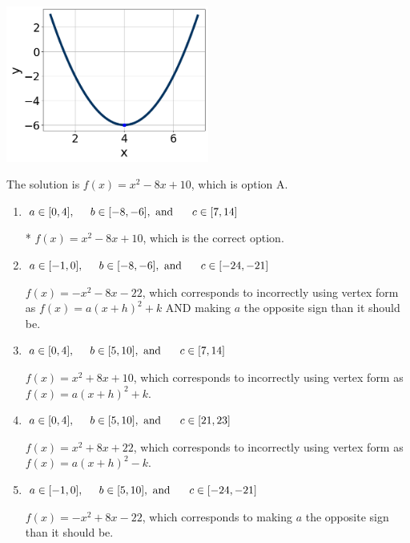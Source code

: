 \documentclass{extbook}[14pt]
\begin{document}
\begin{enumerate}
{\begin{center}
    \includegraphics[width=0.5\textwidth]{../Figures/quadraticGraphToEquationC.png}
\end{center}


The solution is \( f(x) = x^{2} -8 x + 10 \), which is option A.\begin{enumerate}[label=\Alph*.]
\item \( a \in [0, 4], \hspace*{5mm} b \in [-8, -6], \text{ and } \hspace*{5mm} c \in [7, 14] \)

* $f(x)=x^{2} -8 x + 10$, which is the correct option.
\item \( a \in [-1, 0], \hspace*{5mm} b \in [-8, -6], \text{ and } \hspace*{5mm} c \in [-24, -21] \)

$f(x)=-x^{2} -8 x -22$, which corresponds to incorrectly using vertex form as $f(x) = a(x+h)^2+k$ AND making $a$ the opposite sign than it should be.
\item \( a \in [0, 4], \hspace*{5mm} b \in [5, 10], \text{ and } \hspace*{5mm} c \in [7, 14] \)

$f(x)=x^{2} +8 x + 10$, which corresponds to incorrectly using vertex form as $f(x) = a(x+h)^2+k$.
\item \( a \in [0, 4], \hspace*{5mm} b \in [5, 10], \text{ and } \hspace*{5mm} c \in [21, 23] \)

$f(x)=x^{2} +8 x + 22$, which corresponds to incorrectly using vertex form as $f(x) = a(x+h)^2 - k$.
\item \( a \in [-1, 0], \hspace*{5mm} b \in [5, 10], \text{ and } \hspace*{5mm} c \in [-24, -21] \)

$f(x)=-x^{2} +8 x -22$, which corresponds to making $a$ the opposite sign than it should be.
\end{enumerate}

}
\end{enumerate}
\end{document}
